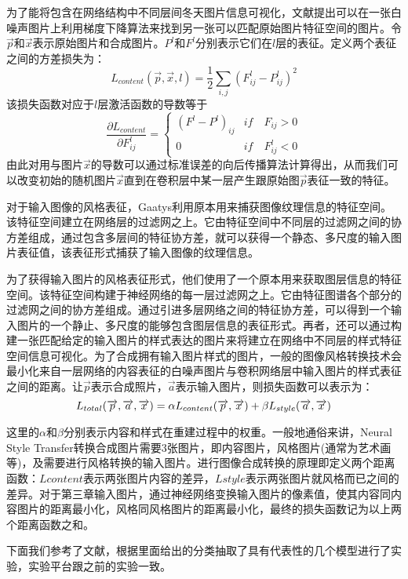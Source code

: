 为了能将包含在网络结构中不同层间冬天图片信息可视化，文献\cite{nst}提出可以在一张白噪声图片上利用梯度下降算法来找到另一张可以匹配原始图片特征空间的图片。令$\overrightarrow{p}$和$\overrightarrow{x}$表示原始图片和合成图片。$P^l$和$F^l$分别表示它们在$l$层的表征。定义两个表征之间的方差损失为：
$$L_{content}(\overrightarrow{p},\overrightarrow{x},l)=\frac{1}{2}\sum_{i,j}(F_{ij}^l-P_{ij}^l)^2$$
该损失函数对应于$l$层激活函数的导数等于
$$\frac{\partial L_{content}}{\partial F_{ij}^l} = \begin{cases}
    (F^l-P^l)_{ij}  & if \quad F_{ij} > 0 \\
    0 & if \quad F_{ij}^l \lt 0
\end{cases}$$
由此对用与图片$\vec{x}$的导数可以通过标准误差的向后传播算法计算得出，从而我们可以改变初始的随机图片$\vec{x}$直到在卷积层中某一层产生跟原始图$\vec{p}$表征一致的特征。

对于输入图像的风格表征，Gaatys利用原本用来捕获图像纹理信息的特征空间。该特征空间建立在网络层的过滤网之上。它由特征空间中不同层的过滤网之间的协方差组成，通过包含多层间的特征协方差，就可以获得一个静态、多尺度的输入图片表征值，该表征形式捕获了输入图像的纹理信息。

为了获得输入图片的风格表征形式，他们使用了一个原本用来获取图层信息的特征空间。该特征空间构建于神经网络的每一层过滤网之上。它由特征图谱各个部分的过滤网之间的协方差组成。通过引进多层网络之间的特征协方差，可以得到一个输入图片的一个静止、多尺度的能够包含图层信息的表征形式。再者，还可以通过构建一张匹配给定的输入图片的样式表达的图片来将建立在网络中不同层的样式特征空间信息可视化。为了合成拥有输入图片样式的图片，一般的图像风格转换技术会最小化来自一层网络的内容表征的白噪声图片与卷积网络层中输入图片的样式表征之间的距离。让$\overrightarrow{p}$表示合成照片，$\overrightarrow{a}$表示输入图片，则损失函数可以表示为：
$$
\centering
L_{total}(\overrightarrow{p},\overrightarrow{a}, \overrightarrow{x})=
\alpha L_{content}(\overrightarrow{p}, \overrightarrow{x}) +
\beta L_{style}(\overrightarrow{a}, \overrightarrow{x})
$$

这里的$\alpha$和$\beta$分别表示内容和样式在重建过程中的权重。一般地通俗来讲，Neural Style Transfer转换合成图片需要3张图片，即内容图片，风格图片(通常为艺术画等)，及需要进行风格转换的输入图片。进行图像合成转换的原理即定义两个距离函数：$Lcontent$表示两张图片内容的差异，$Lstyle$表示两张图片就风格而已之间的差异。对于第三章输入图片，通过神经网络变换输入图片的像素值，使其内容同内容图片的距离最小化，风格同风格图片的距离最小化，最终的损失函数记为以上两个距离函数之和。 

下面我们参考了文献\cite{nst-survey}，根据里面给出的分类抽取了具有代表性的几个模型进行了实验，实验平台跟之前的实验一致。

